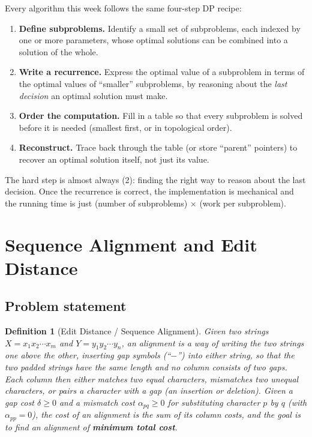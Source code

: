 \documentclass[11pt]{article}
\newtheorem{definition}[theorem]{Definition}
\begin{document}
Every algorithm this week follows the same four-step DP recipe:
\begin{enumerate}[label=(\arabic*)]
    \item \textbf{Define subproblems.} Identify a small set of subproblems, each indexed by
    one or more parameters, whose optimal solutions can be combined into a solution of the
    whole.
    \item \textbf{Write a recurrence.} Express the optimal value of a subproblem in terms
    of the optimal values of ``smaller'' subproblems, by reasoning about the \emph{last
    decision} an optimal solution must make.
    \item \textbf{Order the computation.} Fill in a table so that every subproblem is
    solved before it is needed (smallest first, or in topological order).
    \item \textbf{Reconstruct.} Trace back through the table (or store ``parent'' pointers)
    to recover an optimal solution itself, not just its value.
\end{enumerate}

The hard step is almost always (2): finding the right way to reason about the last
decision. Once the recurrence is correct, the implementation is mechanical and the running
time is just (number of subproblems) $\times$ (work per subproblem).

\section{Sequence Alignment and Edit Distance}

\subsection{Problem statement}

\begin{definition}[Edit Distance / Sequence Alignment]
Given two strings $X = x_1 x_2 \cdots x_m$ and $Y = y_1 y_2 \cdots y_n$, an
\emph{alignment} is a way of writing the two strings one above the other, inserting
\emph{gap} symbols (``$-$'') into either string, so that the two padded strings have the
same length and no column consists of two gaps. Each column then either
\emph{matches} two equal characters, \emph{mismatches} two unequal characters, or pairs a
character with a gap (an \emph{insertion} or \emph{deletion}). Given a \emph{gap cost}
$\delta \ge 0$ and a \emph{mismatch cost} $\alpha_{pq} \ge 0$ for substituting character
$p$ by $q$ (with $\alpha_{pp} = 0$), the cost of an alignment is the sum of its column
costs, and the goal is to find an alignment of \textbf{minimum total cost}.
\end{definition}
\end{document}
